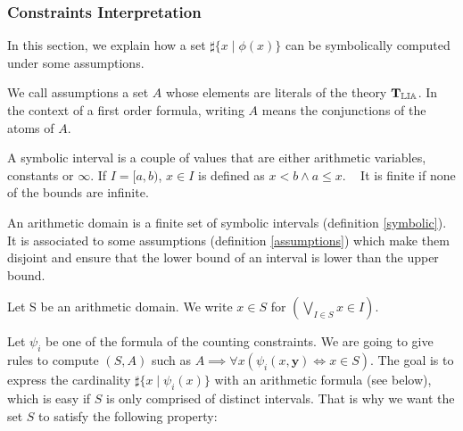\subsubsection{Constraints Interpretation}

In this section, we explain how a set $\sharp\{x\mid\phi(x)\}$ can be symbolically computed under
some assumptions.

\begin{definition}[Assumptions]

We call assumptions a set $A$ whose elements are literals of the theory
$\operatorname{\mathbf{T}_{\mathbb{LIA}}}$. In the context of a first order formula, writing $A$
means the conjunctions of the atoms of $A$.

\label{assumptions}

\end{definition}


\begin{definition}

A symbolic interval is a couple of values that are either arithmetic
variables, constants or $\infty$. If $I = [a, b)$, $x \in I$ is
defined as $x < b \land a \le x$. \newline~\newline
It is finite if none of the bounds are infinite.

\label{symbolic}

\end{definition}


\begin{definition}

An arithmetic domain is a finite set of symbolic intervals (definition
\ref{symbolic}). It is  associated to some assumptions
(definition \ref{assumptions}) which make them disjoint and ensure that
the lower bound of an interval is lower than the upper bound.

\label{arithmetic}

\end{definition}

Let S be an arithmetic domain. We write $x \in S$ for
$\left(\bigvee\limits_{I \in S} x \in I\right)$.

Let $\psi_i$ be one of the formula of the counting constraints. We are going to give rules to compute $(S, A)$ such as
$A \implies \forall x \left(\psi_i(x, \mathbf{y}) \iff x \in S\right)$. The goal is to express the
cardinality $\sharp\{x \mid \psi_i(x)\}$ with an arithmetic formula (see below), which is easy if $S$ is only
comprised of distinct intervals. That is why we want the set $S$
to satisfy the following property:


